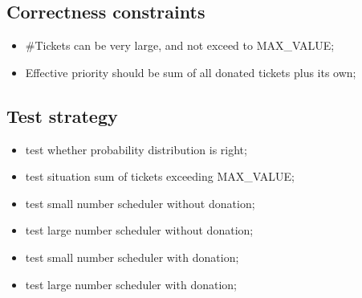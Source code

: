\documentclass[a4paper,10pt]{article}
\begin{document}
\subsection{Correctness constraints}
\begin{itemize}
\item \#Tickets can be very large, and not exceed to MAX\_VALUE;
\item Effective priority should be sum of all donated tickets plus its own;
\end{itemize}

\subsection{Test strategy}
\begin{itemize}
\item test whether probability distribution is right;
\item test situation sum of tickets exceeding MAX\_VALUE;
\item test small number scheduler without donation;
\item test large number scheduler without donation;
\item test small number scheduler with donation;
\item test large number scheduler with donation;
\end{itemize}
\end{document}
